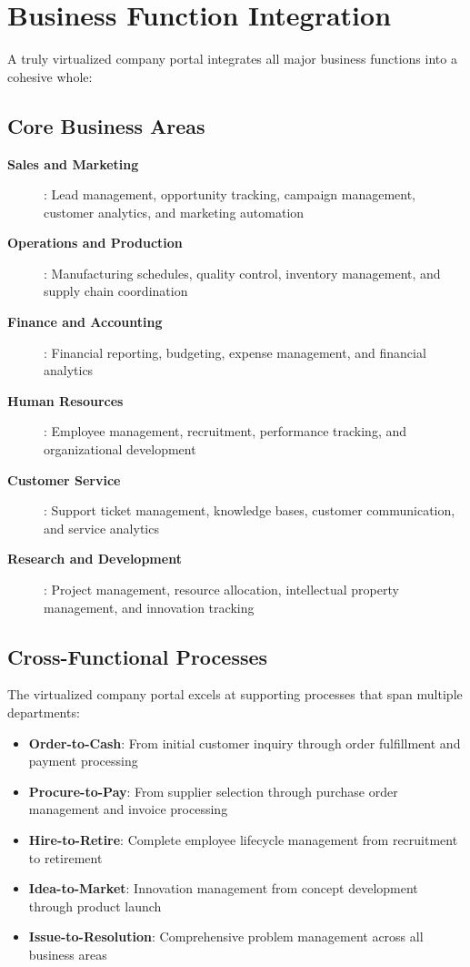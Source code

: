 \section{Business Function Integration}
\label{sec:business-integration}

A truly virtualized company portal integrates all major business functions into a cohesive whole:

\subsection{Core Business Areas}

\begin{description}
\item[\textbf{Sales and Marketing}]: Lead management, opportunity tracking, campaign management, customer analytics, and marketing automation
\item[\textbf{Operations and Production}]: Manufacturing schedules, quality control, inventory management, and supply chain coordination
\item[\textbf{Finance and Accounting}]: Financial reporting, budgeting, expense management, and financial analytics
\item[\textbf{Human Resources}]: Employee management, recruitment, performance tracking, and organizational development
\item[\textbf{Customer Service}]: Support ticket management, knowledge bases, customer communication, and service analytics
\item[\textbf{Research and Development}]: Project management, resource allocation, intellectual property management, and innovation tracking
\end{description}

\subsection{Cross-Functional Processes}

The virtualized company portal excels at supporting processes that span multiple departments:

\begin{itemize}
	\item \textbf{Order-to-Cash}: From initial customer inquiry through order fulfillment and payment processing
	\item \textbf{Procure-to-Pay}: From supplier selection through purchase order management and invoice processing
	\item \textbf{Hire-to-Retire}: Complete employee lifecycle management from recruitment to retirement
	\item \textbf{Idea-to-Market}: Innovation management from concept development through product launch
	\item \textbf{Issue-to-Resolution}: Comprehensive problem management across all business areas
\end{itemize}

